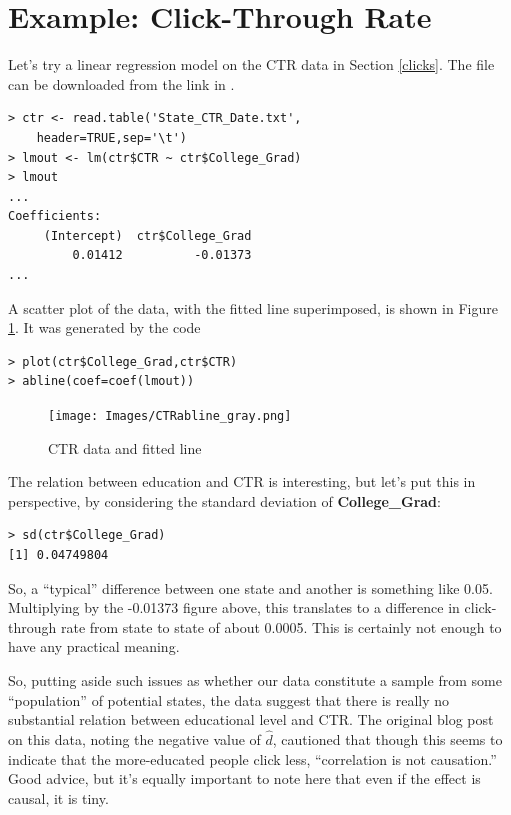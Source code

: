 \section{Example:  Click-Through Rate}
\label{ctr}

Let's try a linear regression model on the CTR data in Section
\ref{clicks}.  The file can be downloaded from the link in
\cite{talblog}.

\begin{lstlisting}
> ctr <- read.table('State_CTR_Date.txt',
    header=TRUE,sep='\t')
> lmout <- lm(ctr$CTR ~ ctr$College_Grad)
> lmout
...
Coefficients:
     (Intercept)  ctr$College_Grad  
         0.01412          -0.01373  
...
\end{lstlisting}

A scatter plot of the data, with the fitted line superimposed, is shown in
Figure \ref{ctrab}.  It was generated by the code

\begin{lstlisting}
> plot(ctr$College_Grad,ctr$CTR)
> abline(coef=coef(lmout))
\end{lstlisting}

\begin{figure}[tb]
\vskip 0.5in
\centerline{
\texttt{[image: Images/CTRabline\_gray.png]}
}
\caption{CTR data and fitted line}
\label{ctrab}
\end{figure}

The relation between education and CTR is interesting, but let's
put this in perspective, by considering the standard deviation of
{\bf College\_Grad}:

\begin{lstlisting}
> sd(ctr$College_Grad)
[1] 0.04749804
\end{lstlisting}

So, a ``typical'' difference between one state and another is something
like 0.05.  Multiplying by the -0.01373 figure above, this translates to
a difference in click-through rate from state to state of about 0.0005.
This is certainly not enough to have any practical meaning.

So, putting aside such issues as whether our data constitute a sample
from some ``population'' of potential states, the data suggest that
there is really no substantial relation between educational level and
CTR.  The original blog post on this data, noting the negative value of
$\widehat{d}$, cautioned that though this seems to indicate that the
more-educated people click less, ``correlation is not causation.''  Good
advice, but it's equally important to note here that even if the effect
is causal, it is tiny.

